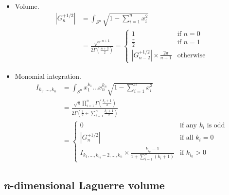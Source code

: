 \documentclass[draft]{scrartcl}
\begin{document}
\begin{itemize}
  \item Volume.
  \[
    \begin{split}
    |G_n^{+1/2}|
      &= \int_{S^n} \sqrt{1 - \sum_{i=1}^n x_i^2}\\
      &= \frac{
        \sqrt{\pi}^{n+1}
      }{
        2\Gamma\left(\frac{n+3}{2}\right)
      }
      = \begin{cases}
        1&\text{if $n=0$}\\
        \frac{\pi}{2}&\text{if $n=1$}\\
        |G_{n-2}^{+1/2}| \times \frac{2\pi}{n+1}&\text{otherwise}
      \end{cases}
  \end{split}
  \]

  \item Monomial integration.
  \[
    \begin{split}
    I_{k_1,\dots,k_n}
      &= \int_{S^n} x_1^{k_1}\dots x_n^{k_n} \sqrt{1 - \sum_{i=1}^n
      x_i^2}\\
      &= \frac{
        \sqrt{\pi}\prod_{i=1}^n \Gamma\left(\frac{k_i+1}{2}\right)
      }{
        2\Gamma\left(\frac{3}{2} + \sum_{i=1}^n \frac{k_i+1}{2}\right)
      }\\
      &= \begin{cases}
        0&\text{if any $k_i$ is odd}\\
        |G_n^{+1/2}|&\text{if all $k_i=0$}\\
        I_{k_1,\dots,k_{i_0}-2,\dots,k_n} \times \frac{k_{i_0}-1}{1 + \sum_{i=1}^n(k_i+1)}&\text{if $k_{i_0} > 0$}
      \end{cases}
    \end{split}
  \]
\end{itemize}


\subsection*{\textit{n}-dimensional Laguerre volume}
\end{document}
